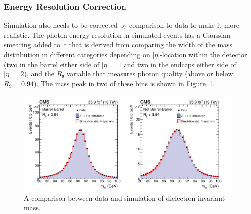 \subsubsection{Energy Resolution Correction}
Simulation also needs to be corrected by comparison to data to make it more realistic. The photon energy resolution in simulated events has a Gaussian smearing added to it that is derived from comparing the width of the \Zee mass distribution in different categories depending on $|\eta|$-location within the detector (two in the barrel either side of $|\eta|=1$ and two in the endcaps either side of $|\eta|=2$), and the $R_{9}$ variable that measures photon quality (above or below $R_{9}=0.94$).
The mass peak in two of these bins is shown in Figure~\ref{fig:object_reco:invariant_mass_validation}.
\begin{figure}[h!]
    \centering
    \includegraphics[width=0.99\textwidth]{figures/object_reco/CMS-HIG-16-040_Figure_001.pdf}
    \caption{A comparison between data and simulation of dielectron invariant mass.}
        \label{fig:object_reco:invariant_mass_validation}
\end{figure}


